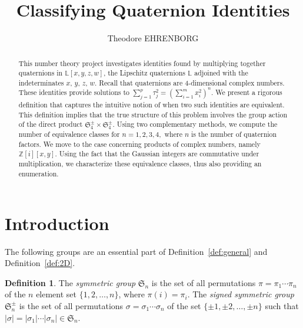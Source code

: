 \documentclass[12pt]{article}
\theoremstyle{definition}
\newtheorem{definition}[theorem]{Definition}
\numberwithin{equation}{section}
\begin{document}


\title{Classifying Quaternion Identities}


\author{\sc Theodore EHRENBORG%
}



\date{}

\maketitle



\begin{abstract}
This number theory project investigates identities found by
multiplying together quaternions in \( \mathbb{L}[x,y,z,w] \), the
Lipschitz quaternions \( \mathbb{L} \) adjoined with the
indeterminates \(x\), \(y\), \(z\), \(w\).  Recall that quaternions
are \(4\)-dimensional complex numbers.  These identities provide
solutions to \( \sum_{j = 1}^{p} \tau_j ^ 2 = \left( \sum_{i = 1}^{m}
x_i ^ 2 \right) ^ n \). We present a rigorous definition that captures
the intuitive notion of when two such identities are equivalent. This
definition implies that the true structure of this problem involves the
group action of the direct product \( \mathfrak{S}_4^\pm \times \mathfrak{S}_4^\pm \).  Using
two complementary methods, we compute the number of equivalence
classes for \(n = 1, 2, 3, 4,\) where \(n\) is the number of
quaternion factors. We move to the case concerning products of complex
numbers, namely \( \mathbb{Z}[i][x,y] \). Using the fact that the
Gaussian integers are commutative under multiplication, we
characterize these equivalence classes, thus also providing an
enumeration.


\end{abstract}





\section{Introduction}



The following groups are an essential part of Definition~\ref{def:general}
and Definition~\ref{def:2D}.
\begin{definition}
The {\em symmetric group} \( \mathfrak{S}_n \) is the 
set of all permutations \( \pi = \pi_1 \cdots \pi_n \) 
of the \( n \) element set \( \{ 1, 2, \ldots, n \} \),
where \( \pi(i) = \pi_i \).
The {\em signed symmetric group} \( \mathfrak{S}_n^\pm \)
is the set of all permutations \( \sigma = \sigma_1 \cdots \sigma_n\)
of the set \( \{ \pm 1, \pm 2, \ldots, \pm n \} \) such that
\( | \sigma | = | \sigma_1 | \cdots |\sigma_n| \in \mathfrak{S}_n \).
\end{definition}
\end{document}
